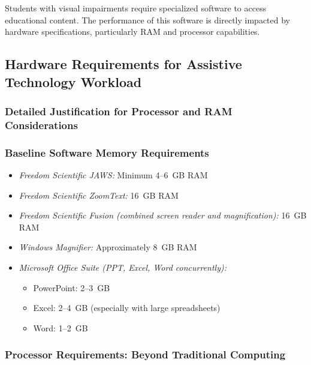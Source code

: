 Students with visual impairments require specialized software to access educational content. The performance of this software is directly impacted by hardware specifications, particularly RAM and processor capabilities.

\subsection{Hardware Requirements for Assistive Technology Workload}\label{hardware-justification-ai-ram}

\subsubsection{Detailed Justification for Processor and RAM Considerations}

\subsubsection{Baseline Software Memory Requirements}

\begin{itemize}
\item \emph{Freedom Scientific JAWS:} Minimum 4--6~GB RAM \cite{FreedomScientificJAWSRequirements}
\item \emph{Freedom Scientific ZoomText:} 16~GB RAM \cite{FreedomScientificZoomTextRequirements}
\item \emph{Freedom Scientific Fusion (combined screen reader and magnification):} 16~GB RAM \cite{FreedomScientificFusionRequirements}
\item \emph{Windows Magnifier:} Approximately 8~GB RAM \cite{MicrosoftWindowsAccessibility}
\item \emph{Microsoft Office Suite (PPT, Excel, Word concurrently):} \cite{MicrosoftOfficeSystemRequirements}

\begin{itemize}
\item PowerPoint: 2--3~GB
\item Excel: 2--4~GB (especially with large spreadsheets)
\item Word: 1--2~GB
\end{itemize}

\end{itemize}


\subsubsection{Processor Requirements: Beyond Traditional Computing}

